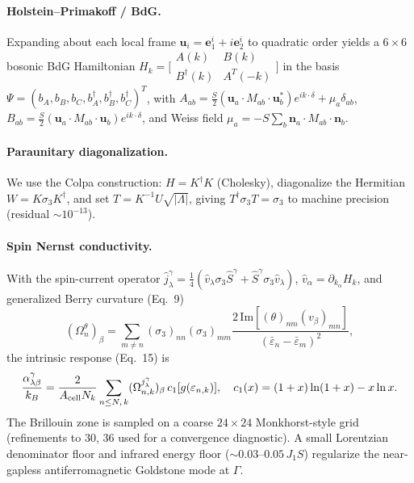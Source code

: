 \documentclass[11pt]{article}
\begin{document}
\paragraph{Holstein--Primakoff / BdG.} Expanding about each local frame
$\mathbf u_i=\mathbf e_1^i+i\mathbf e_2^i$ to quadratic order yields a
$6\times6$ bosonic BdG Hamiltonian $H_k=\big[\begin{smallmatrix}A(k)&B(k)\\ B^\dagger(k)&A^T(-k)\end{smallmatrix}\big]$
in the basis $\Psi=(b_A,b_B,b_C,b_A^\dagger,b_B^\dagger,b_C^\dagger)^T$, with
$A_{ab}=\tfrac{S}{2}(\mathbf u_a\!\cdot\!M_{ab}\!\cdot\!\mathbf u_b^*)e^{ik\cdot\delta}+\mu_a\delta_{ab}$,
$B_{ab}=\tfrac{S}{2}(\mathbf u_a\!\cdot\!M_{ab}\!\cdot\!\mathbf u_b)e^{ik\cdot\delta}$,
and Weiss field $\mu_a=-S\sum_b \mathbf n_a\!\cdot\!M_{ab}\!\cdot\!\mathbf n_b$.

\paragraph{Paraunitary diagonalization.} We use the Colpa construction:
$H=K^\dagger K$ (Cholesky), diagonalize the Hermitian $W=K\sigma_3 K^\dagger$,
and set $T=K^{-1}U\sqrt{|\Lambda|}$, giving $T^\dagger\sigma_3 T=\sigma_3$ to
machine precision (residual $\sim 10^{-13}$).

\paragraph{Spin Nernst conductivity.} With the spin-current operator
$\hat j^\gamma_\lambda=\tfrac14(\hat v_\lambda\sigma_3\hat S^\gamma+\hat S^\gamma\sigma_3\hat v_\lambda)$,
$\hat v_\alpha=\partial_{k_\alpha}H_k$, and generalized Berry curvature (Eq.~9)
\begin{equation}
(\Omega^{\theta}_{n})_\beta=\sum_{m\neq n}(\sigma_3)_{nn}(\sigma_3)_{mm}
\frac{2\,\mathrm{Im}[(\theta)_{nm}(v_\beta)_{mn}]}{(\bar\varepsilon_n-\bar\varepsilon_m)^2},
\end{equation}
the intrinsic response (Eq.~15) is
\begin{equation}
\frac{\alpha^\gamma_{\lambda\beta}}{k_B}
=\frac{2}{A_{\rm cell}N_k}\sum_{n\le N,\,k}(\Omega^{j^\gamma_\lambda}_{n,k})_\beta\,
c_1[g(\varepsilon_{n,k})],\quad c_1(x)=(1+x)\ln(1+x)-x\ln x .
\end{equation}
The Brillouin zone is sampled on a coarse $24\times24$ Monkhorst-style grid
(refinements to $30$, $36$ used for a convergence diagnostic). A small
Lorentzian denominator floor and infrared energy floor ($\sim0.03$--$0.05\,J_1S$)
regularize the near-gapless antiferromagnetic Goldstone mode at $\Gamma$.
\end{document}
